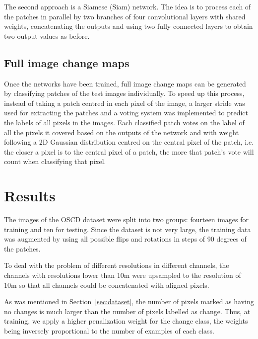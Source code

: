 \documentclass{article}
\begin{document}
The second approach is a Siamese (Siam) network. The idea is to process each of the patches in parallel by two branches of four convolutional layers with shared weights, concatenating the outputs and using two fully connected layers to obtain two output values as before.





\subsection{Full image change maps}
\label{ssec:cd-cms}

 

Once the networks have been trained, full image change maps can be generated by classifying patches of the test images individually. To speed up this process, instead of taking a patch centred in each pixel of the image, a larger stride was used for extracting the patches and a voting system was implemented to predict the labels of all pixels in the images. Each classified patch votes on the label of all the pixels it covered based on the outputs of the network and with weight following a 2D Gaussian distribution centred on the central pixel of the patch, i.e. the closer a pixel is to the central pixel of a patch, the more that patch's vote will count when classifying that pixel.


\section{Results}
\label{sec:results}


The images of the OSCD dataset were split into two groups: fourteen images for training and ten for testing. Since the dataset is not very large, the training data was augmented by using all possible flips and rotations in steps of 90 degrees of the patches.

To deal with the problem of different resolutions in different channels, the channels with resolutions lower than 10m were upsampled to the resolution of 10m so that all channels could be concatenated with aligned pixels.

As was mentioned in Section~\ref{sec:dataset}, the number of pixels marked as having no changes is much larger than the number of pixels labelled as change. Thus, at training, we apply a higher penalization weight for the change class, the weights being inversely proportional to the number of examples of each class.
\end{document}
